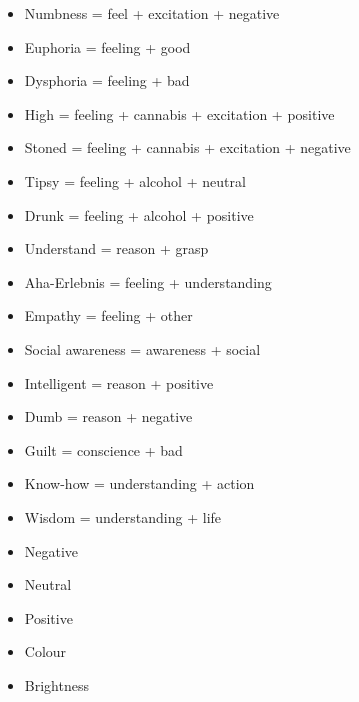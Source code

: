 \begin{multicols}{2}
\begin{itemize}
\item   Numbness = feel + excitation + negative 

\item   Euphoria = feeling + good 

\item   Dysphoria = feeling + bad 

\item   High = feeling + cannabis + excitation + positive 

\item   Stoned = feeling + cannabis + excitation + negative 

\item   Tipsy = feeling + alcohol + neutral 

\item   Drunk = feeling + alcohol + positive 

\item   Understand = reason + grasp 

\item   Aha-Erlebnis = feeling + understanding 

\item   Empathy = feeling + other 

\item   Social awareness = awareness + social 

\item   Intelligent = reason + positive 

\item   Dumb = reason + negative 

\item   Guilt = conscience + bad 

\item   Know-how = understanding + action 

\item   Wisdom = understanding + life 
\end{itemize}


\begin{itemize}
\item   Negative 

\item   Neutral  

\item   Positive  

\item   Colour 

\item   Brightness 


\end{itemize}
\end{multicols}
